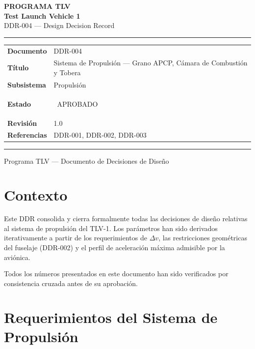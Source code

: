 \documentclass[11pt, a4paper]{article}
\newcommand{\status}[1]{\colorbox{tlvgreen}{\color{white}\small\bfseries\strut\ #1\ }}
\begin{document}
\begin{titlepage}
  \centering\vspace*{3cm}
  {\large\color{gray}\bfseries PROGRAMA TLV}\\[0.4cm]
  {\Huge\color{tlvblue}\bfseries Test Launch Vehicle 1}\\[0.3cm]
  {\Large\color{tlvmid} DDR-004 --- Design Decision Record}\\[2cm]
  \color{tlvrule}\hrule height 0.8pt\vspace{0.6cm}
  \begin{tabular}{L{4cm} L{9cm}}
    \textbf{Documento}   & DDR-004 \\
    \textbf{T\'{i}tulo}  & Sistema de Propulsi\'{o}n --- Grano APCP, C\'{a}mara de Combusti\'{o}n y Tobera \\
    \textbf{Subsistema}  & Propulsi\'{o}n \\
    \textbf{Estado}      & \status{APROBADO} \\
    \textbf{Revisi\'{o}n} & 1.0 \\
    \textbf{Referencias} & DDR-001, DDR-002, DDR-003 \\
  \end{tabular}
  \vspace{0.6cm}\color{tlvrule}\hrule height 0.8pt
  \vfill
  {\small\color{gray} Programa TLV --- Documento de Decisiones de Dise\~{n}o}
\end{titlepage}

\section{Contexto}

Este DDR consolida y cierra formalmente todas las decisiones de dise\~{n}o relativas al sistema de propulsi\'{o}n del TLV-1. Los par\'{a}metros han sido derivados iterativamente a partir de los requerimientos de $\Delta v$, las restricciones geom\'{e}tricas del fuselaje (DDR-002) y el perfil de aceleraci\'{o}n m\'{a}xima admisible por la aviónica.

Todos los n\'{u}meros presentados en este documento han sido verificados por consistencia cruzada antes de su aprobaci\'{o}n.

\section{Requerimientos del Sistema de Propulsi\'{o}n}
\end{document}
